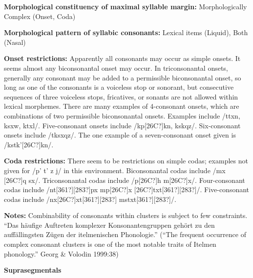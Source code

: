 \begin{styleBody}
\textbf{Morphological constituency of maximal syllable margin:} Morphologically Complex (Onset, Coda)
\end{styleBody}

\begin{styleBody}
\textbf{Morphological pattern of syllabic consonants:} Lexical items (Liquid), Both (Nasal)
\end{styleBody}

\begin{styleBody}
\textbf{Onset restrictions: }Apparently all consonants may occur as simple onsets. It seems almost any biconsonantal onset may occur. In triconsonantal onsets, generally any consonant may be added to a permissible biconsonantal onset, so long as one of the consonants is a voiceless stop or sonorant, but consecutive sequences of three voiceless stops, fricatives, or sonants are not allowed within lexical morphemes. There are many examples of 4-consonant onsets, which are combinations of two permissible biconsonantal onsets. Examples include /ttxn, ksxw, ktxl/. Five-consonant onsets include /kp[26C?]kn, kskqz/. Six-consonant onsets include /tksxqz/. The one example of a seven-consonant onset given is /kstk’[26C?]kn/.
\end{styleBody}

\begin{styleBody}
\textbf{Coda restrictions: }There seem to be restrictions on simple codas; examples not given for /p’ t’ z j/ in this environment. Biconsonantal codas include /mx [26C?]q sx/. Triconsonantal codas include /p[26C?]h m[26C?]x/. Four-consonant codas include /nt[361?][283?]px mp[26C?]x [26C?]txt[361?][283?]/. Five-consonant codas include /nx[26C?]xt[361?][283?] mstxt[361?][283?]/.
\end{styleBody}

\begin{styleBody}
\textbf{Notes: }Combinability of consonants within clusters is subject to few constraints. “Das häufige Auftreten komplexer Konsonantengruppen gehört zu den auffällingsten Zügen der itelmenischen Phonologie.” (“The frequent occurrence of complex consonant clusters is one of the most notable traits of Itelmen phonology.” Georg \& Volodin 1999:38)
\end{styleBody}

\begin{styleBody}
\textbf{Suprasegmentals}
\end{styleBody}

